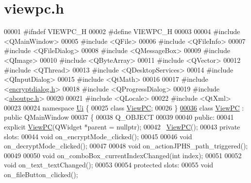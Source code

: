 \hypertarget{viewpc_8h_source}{}\section{viewpc.\+h}
\label{viewpc_8h_source}

\begin{DoxyCode}
00001 \textcolor{preprocessor}{#ifndef VIEWPC\_H}
00002 \textcolor{preprocessor}{#define VIEWPC\_H}
00003 
00004 \textcolor{preprocessor}{#include <QMainWindow>}
00005 \textcolor{preprocessor}{#include <QFile>}
00006 \textcolor{preprocessor}{#include <QFileInfo>}
00007 \textcolor{preprocessor}{#include <QFileDialog>}
00008 \textcolor{preprocessor}{#include <QMessageBox>}
00009 \textcolor{preprocessor}{#include <QImage>}
00010 \textcolor{preprocessor}{#include <QByteArray>}
00011 \textcolor{preprocessor}{#include <QVector>}
00012 \textcolor{preprocessor}{#include <QThread>}
00013 \textcolor{preprocessor}{#include <QDesktopServices>}
00014 \textcolor{preprocessor}{#include <QInputDialog>}
00015 \textcolor{preprocessor}{#include <QtMath>}
00016 
00017 \textcolor{preprocessor}{#include <\hyperlink{encryptdialog_8h}{encryptdialog.h}>}
00018 \textcolor{preprocessor}{#include <QProgressDialog>}
00019 \textcolor{preprocessor}{#include <\hyperlink{aboutpc_8h}{aboutpc.h}>}
00020 
00021 \textcolor{preprocessor}{#include <QLocale>}
00022 \textcolor{preprocessor}{#include <QtXml>}
00023 
00024 \textcolor{keyword}{namespace }\hyperlink{namespace_ui}{Ui} \{
00025 \textcolor{keyword}{class }\hyperlink{class_view_p_c}{ViewPC};
00026 \}
\hypertarget{viewpc_8h_source.tex_l00036}{}\hyperlink{class_view_p_c}{00036} \textcolor{keyword}{class }\hyperlink{class_view_p_c}{ViewPC} : \textcolor{keyword}{public} QMainWindow
00037 \{
00038     Q\_OBJECT
00039 
00040 \textcolor{keyword}{public}:
00041     \textcolor{keyword}{explicit} \hyperlink{class_view_p_c}{ViewPC}(QWidget *parent = \textcolor{keyword}{nullptr});
00042     ~\hyperlink{class_view_p_c}{ViewPC}();
00043 \textcolor{keyword}{private} slots:
00044     \textcolor{keywordtype}{void} on\_encryptMode\_clicked();
00045 
00046     \textcolor{keywordtype}{void} on\_decryptMode\_clicked();
00047 
00048     \textcolor{keywordtype}{void} on\_actionJPHS\_path\_triggered();
00049 
00050     \textcolor{keywordtype}{void} on\_comboBox\_currentIndexChanged(\textcolor{keywordtype}{int} index);
00051 
00052     \textcolor{keywordtype}{void} on\_text\_textChanged();
00053 
00054 \textcolor{keyword}{protected} slots:
00055     \textcolor{keywordtype}{void} on\_fileButton\_clicked();

\end{DoxyCode}
